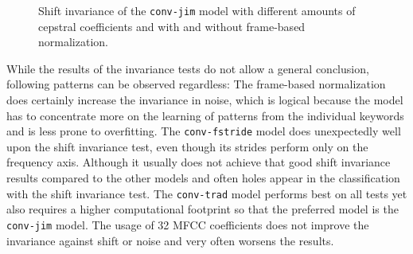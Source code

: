 \begin{figure}[!ht]
  \centering
  \quad
  \quad
  \caption{Shift invariance of the \texttt{conv-jim} model with different amounts of cepstral coefficients and with and without frame-based normalization.}
  \label{fig:exp_fs_cepstral_tb_shift_conv-jim}
\end{figure}
\FloatBarrier
\noindent
While the results of the invariance tests do not allow a general conclusion, following patterns can be observed regardless:
The frame-based normalization does certainly increase the invariance in noise, which is logical because the model has to concentrate more on the learning of patterns from the individual keywords and is less prone to overfitting.
The \texttt{conv-fstride} model does unexpectedly well upon the shift invariance test, even though its strides perform only on the frequency axis.
Although it usually does not achieve that good shift invariance results compared to the other models and often holes appear in the classification with the shift invariance test.
The \texttt{conv-trad} model performs best on all tests yet also requires a higher computational footprint so that the preferred model is the \texttt{conv-jim} model.
The usage of 32 MFCC coefficients does not improve the invariance against shift or noise and very often worsens the results.



